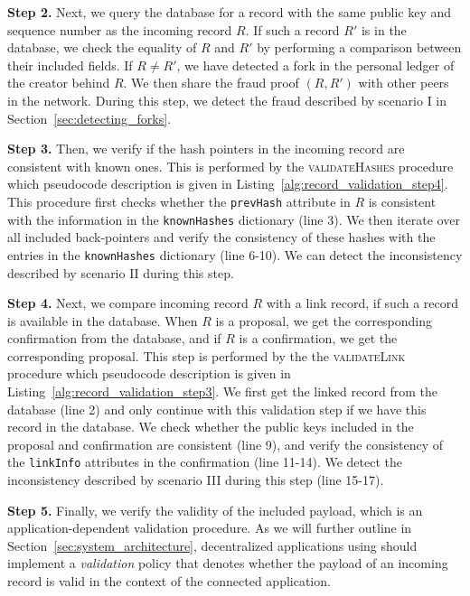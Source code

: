 \textbf{Step 2.}
Next, we query the database for a record with the same public key and sequence number as the incoming record $ R $.
If such a record $ R' $ is in the database, we check the equality of $ R $ and $ R' $ by performing a comparison between their included fields.
If $ R \not= R' $, we have detected a fork in the personal ledger of the creator behind $ R $.
We then share the fraud proof $ (R, R') $ with other peers in the network.
During this step, we detect the fraud described by scenario I in Section~\ref{sec:detecting_forks}.

\textbf{Step 3.}
Then, we verify if the hash pointers in the incoming record are consistent with known ones.
This is performed by the \textsc{validateHashes} procedure which pseudocode description is given in Listing~\ref{alg:record_validation_step4}.
This procedure first checks whether the \texttt{prevHash} attribute in $ R $ is consistent with the information in the \texttt{knownHashes} dictionary (line 3).
We then iterate over all included back-pointers and verify the consistency of these hashes with the entries in the \texttt{knownHashes} dictionary (line 6-10).
We can detect the inconsistency described by scenario II during this step.

\textbf{Step 4.}
Next, we compare incoming record $ R $ with a link record, if such a record is available in the database.
When $ R $ is a proposal, we get the corresponding confirmation from the database, and if $ R $ is a confirmation, we get the corresponding proposal.
This step is performed by the the \textsc{validateLink} procedure which pseudocode description is given in Listing~\ref{alg:record_validation_step3}.
We first get the linked record from the database (line 2) and only continue with this validation step if we have this record in the database.
We check whether the public keys included in the proposal and confirmation are consistent (line 9), and verify the consistency of the \texttt{linkInfo} attributes in the confirmation (line 11-14).
We detect the inconsistency described by scenario III during this step (line 15-17).

\textbf{Step 5.}
Finally, we verify the validity of the included payload, which is an application-dependent validation procedure.
As we will further outline in Section~\ref{sec:system_architecture}, decentralized applications using \ModelName{} should implement a \emph{validation} policy that denotes whether the payload of an incoming record is valid in the context of the connected application.

